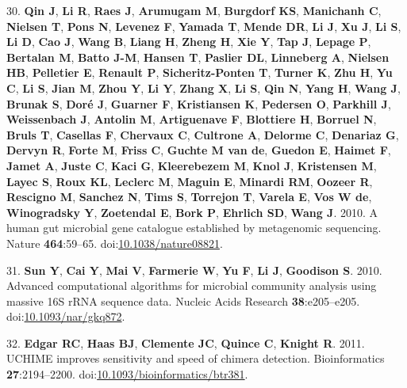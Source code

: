 \documentclass[12pt,]{article}
\begin{document}
\hypertarget{ref-Qin2010}{}
30. \textbf{Qin J}, \textbf{Li R}, \textbf{Raes J}, \textbf{Arumugam M},
\textbf{Burgdorf KS}, \textbf{Manichanh C}, \textbf{Nielsen T},
\textbf{Pons N}, \textbf{Levenez F}, \textbf{Yamada T}, \textbf{Mende
DR}, \textbf{Li J}, \textbf{Xu J}, \textbf{Li S}, \textbf{Li D},
\textbf{Cao J}, \textbf{Wang B}, \textbf{Liang H}, \textbf{Zheng H},
\textbf{Xie Y}, \textbf{Tap J}, \textbf{Lepage P}, \textbf{Bertalan M},
\textbf{Batto J-M}, \textbf{Hansen T}, \textbf{Paslier DL},
\textbf{Linneberg A}, \textbf{Nielsen HB}, \textbf{Pelletier E},
\textbf{Renault P}, \textbf{Sicheritz-Ponten T}, \textbf{Turner K},
\textbf{Zhu H}, \textbf{Yu C}, \textbf{Li S}, \textbf{Jian M},
\textbf{Zhou Y}, \textbf{Li Y}, \textbf{Zhang X}, \textbf{Li S},
\textbf{Qin N}, \textbf{Yang H}, \textbf{Wang J}, \textbf{Brunak S},
\textbf{Doré J}, \textbf{Guarner F}, \textbf{Kristiansen K},
\textbf{Pedersen O}, \textbf{Parkhill J}, \textbf{Weissenbach J},
\textbf{Antolin M}, \textbf{Artiguenave F}, \textbf{Blottiere H},
\textbf{Borruel N}, \textbf{Bruls T}, \textbf{Casellas F},
\textbf{Chervaux C}, \textbf{Cultrone A}, \textbf{Delorme C},
\textbf{Denariaz G}, \textbf{Dervyn R}, \textbf{Forte M}, \textbf{Friss
C}, \textbf{Guchte M van de}, \textbf{Guedon E}, \textbf{Haimet F},
\textbf{Jamet A}, \textbf{Juste C}, \textbf{Kaci G}, \textbf{Kleerebezem
M}, \textbf{Knol J}, \textbf{Kristensen M}, \textbf{Layec S},
\textbf{Roux KL}, \textbf{Leclerc M}, \textbf{Maguin E}, \textbf{Minardi
RM}, \textbf{Oozeer R}, \textbf{Rescigno M}, \textbf{Sanchez N},
\textbf{Tims S}, \textbf{Torrejon T}, \textbf{Varela E}, \textbf{Vos W
de}, \textbf{Winogradsky Y}, \textbf{Zoetendal E}, \textbf{Bork P},
\textbf{Ehrlich SD}, \textbf{Wang J}. 2010. A human gut microbial gene
catalogue established by metagenomic sequencing. Nature
\textbf{464}:59--65.
doi:\href{https://doi.org/10.1038/nature08821}{10.1038/nature08821}.

\hypertarget{ref-Sun2010}{}
31. \textbf{Sun Y}, \textbf{Cai Y}, \textbf{Mai V}, \textbf{Farmerie W},
\textbf{Yu F}, \textbf{Li J}, \textbf{Goodison S}. 2010. Advanced
computational algorithms for microbial community analysis using massive
16S rRNA sequence data. Nucleic Acids Research \textbf{38}:e205--e205.
doi:\href{https://doi.org/10.1093/nar/gkq872}{10.1093/nar/gkq872}.

\hypertarget{ref-Edgar2011}{}
32. \textbf{Edgar RC}, \textbf{Haas BJ}, \textbf{Clemente JC},
\textbf{Quince C}, \textbf{Knight R}. 2011. UCHIME improves sensitivity
and speed of chimera detection. Bioinformatics \textbf{27}:2194--2200.
doi:\href{https://doi.org/10.1093/bioinformatics/btr381}{10.1093/bioinformatics/btr381}.
\end{document}
